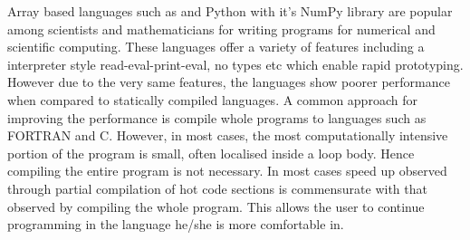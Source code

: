 Array based languages such as \matlab \cite{matlab} and Python with it's NumPy library are popular among scientists and mathematicians for writing programs for numerical and scientific computing. These languages offer a variety of features including a interpreter style read-eval-print-eval, no types etc which enable rapid prototyping. However due to the very same features, the languages show poorer performance when compared to statically compiled languages. A common approach for improving the performance is compile whole programs to languages such as {\sc FORTRAN} and C. However, in most cases, the most computationally intensive portion of the program is small, often localised inside a loop body. Hence compiling the entire program is not necessary. In most cases speed up observed through partial compilation of hot code sections is commensurate with that observed by compiling the whole program. This allows the user to continue programming in the language he/she is more comfortable in.\\


